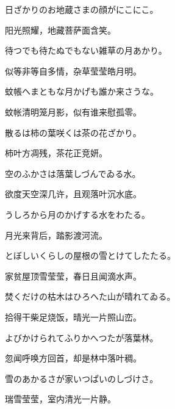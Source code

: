 \begin{haiku}
    {\FH 日ざかりのお地蔵さまの顔がにこにこ。}

    {\FK 阳光照耀，地藏菩萨面含笑。}
\end{haiku}

\begin{haiku}
    {\FH 待つでも待たぬでもない雑草の月あかり。}

    {\FK 似等非等自多情，杂草莹莹皓月明。}
\end{haiku}

\begin{haiku}
    {\FH 蚊帳へまともな月かげも誰か来さうな。}

    {\FK 蚊帐清明笼月影，似有谁来慰孤零。}
\end{haiku}

\begin{haiku}
    {\FH 散るは柿の葉咲くは茶の花ざかり。}

    {\FK 柿叶方凋残，茶花正竞妍。}
\end{haiku}

\begin{haiku}
    {\FH 空のふかさは落葉しづんでゐる水。}

    {\FK 欲度天空深几许，且观落叶沉水底。}
\end{haiku}

\begin{haiku}
    {\FH うしろから月のかげする水をわたる。}

    {\FK 月光来背后，踏影渡河流。}
\end{haiku}

\begin{haiku}
    {\FH とぼしいくらしの屋根の雪とけてしたたる。}

    {\FK 家贫屋顶雪莹莹，春日且闻滴水声。}
\end{haiku}

\begin{haiku}
    {\FH 焚くだけの枯木はひろへた山が晴れてゐる。}

    {\FK 拾得干柴足烧饭，晴光一片照山峦。}
\end{haiku}

\begin{haiku}
    {\FH よびかけられてふりかへつたが落葉林。}

    {\FK 忽闻呼唤方回首，却是林中落叶稠。}
\end{haiku}

\begin{haiku}
    {\FH 雪のあかるさが家いつぱいのしづけさ。}

    {\FK 瑞雪莹莹，室内清光一片静。}
\end{haiku}

